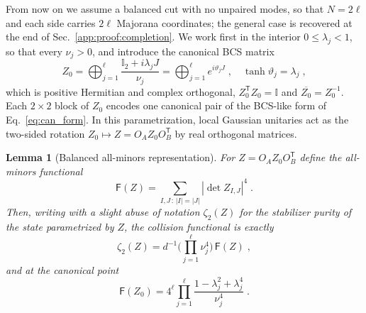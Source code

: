 \documentclass[aps,prl,twocolumn,superscriptaddress,reprint,longbibliography,nofootinbib]{revtex4-2}
\newtheorem{lemma}{Lemma}
\newcommand{\trans}{\mathsf{T}}
\begin{document}
From now on we assume a balanced cut with no unpaired modes, so that $N=2\ell$ and each side carries $2\ell$ Majorana coordinates; the general case is recovered at the end of Sec.~\ref{app:proof:completion}.
We work first in the interior $0\le\lambda_j<1$, so that every $\nu_j>0$,
and introduce the canonical BCS matrix~\cite{Mbeng2024}
\begin{equation}
Z_0=\bigoplus_{j=1}^{\ell}\frac{\mathbb{I}_2+i\lambda_jJ}{\nu_j}=\bigoplus_{j=1}^{\ell}e^{i\vartheta_jJ}\;,\quad \tanh \vartheta_j=\lambda_j\;,
    \label{eq:Z0}
\end{equation} 
which is positive Hermitian and complex orthogonal, $Z_0^{\trans}Z_0=\mathbb{I}$ and $\overline{Z_0}=Z_0^{-1}$. Each $2\times2$ block of $Z_0$ encodes one canonical pair of the BCS-like form of Eq.~\eqref{eq:can_form}. In this parametrization, local Gaussian unitaries act as the two-sided rotation $Z_0\mapsto Z=O_AZ_0O_B^{\trans}$ by real orthogonal matrices.

\begin{lemma}[Balanced all-minors representation]
\label{lem:all-minors}
For $Z=O_AZ_0O_B^{\trans}$ define the all-minors functional
\begin{equation}
    \mathsf{F}(Z)=\sum_{I,J\,:\,|I|=|J|}\left|\det Z_{I,J}\right|^4\;.
    \label{eq:F-definition}
\end{equation}
Then, writing with a slight abuse of notation $\zeta_2(Z)$ for the stabilizer purity of the state parametrized by $Z$, the collision functional is exactly
\begin{equation}\zeta_2(Z)=d^{-1}\Big(\prod_{j=1}^{\ell}\nu_j^4\Big)\,\mathsf{F}(Z)\;,
    \label{eq:physical-F}
\end{equation}
and at the canonical point
\begin{equation}
    \mathsf{F}(Z_0)=4^{\ell}\prod_{j=1}^{\ell}\frac{1-\lambda_j^2+\lambda_j^4}{\nu_j^4}\;.
    \label{eq:F-canonical}
\end{equation}
\end{lemma}
\end{document}
